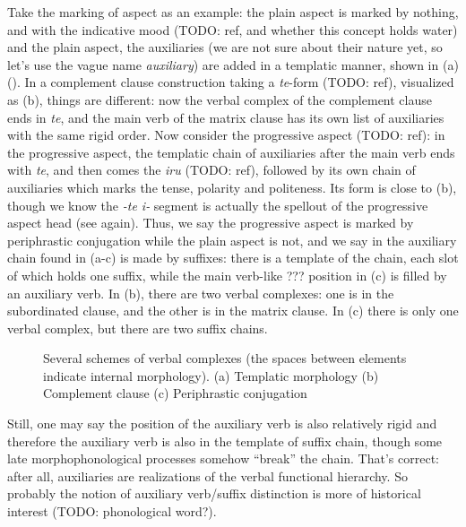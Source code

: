 \documentclass[UTF8, a4paper, oneside, scheme=plain]{ctexrep}
\newcommand*{\term}[1]{\emph{#1}}
\newcommand{\corpus}[1]{\emph{#1}}
\begin{document}
Take the marking of aspect as an example:
the plain aspect is marked by nothing, and with the indicative mood (TODO: ref, and whether this concept holds water) and the plain aspect,
the auxiliaries (we are not sure about their nature yet, so let's use the vague name \term{auxiliary}) 
are added in a templatic manner, shown in (a) 
().
In a complement clause construction taking a \corpus{te}-form (TODO: ref),
visualized as (b),
things are different: now the verbal complex of the complement clause ends in \corpus{te},
and the main verb of the matrix clause has its own list of auxiliaries with the same rigid order.
Now consider the progressive aspect (TODO: ref):
in the progressive aspect, the templatic chain of auxiliaries after the main verb ends with \corpus{te},
and then comes the \corpus{iru} (TODO: ref), followed by its own chain of auxiliaries 
which marks the tense, polarity and politeness.
Its form is close to (b),
though we know the \corpus{-te i-} segment is actually the spellout of the progressive aspect head 
(see  again).
Thus, we say the progressive aspect is marked by periphrastic conjugation 
while the plain aspect is not,
and we say in the auxiliary chain found in 
(a-c)
is made by suffixes: 
there is a template of the chain, each slot of which holds one suffix,
while the main verb-like ??? position in (c) 
is filled by an auxiliary verb.
In (b),
there are two verbal complexes:
one is in the subordinated clause,
and the other is in the matrix clause.
In (c)
there is only one verbal complex,
but there are two suffix chains.

\begin{figure}[H]
    \centering
    
    \caption{Several schemes of verbal complexes (the spaces between elements indicate internal morphology). 
    (a) Templatic morphology (b) Complement clause (c) Periphrastic conjugation}
    \label{fig:verb-complex-scheme}
\end{figure}

Still, one may say the position of the auxiliary verb is also relatively rigid 
and therefore the auxiliary verb is also in the template of suffix chain,
though some late morphophonological processes somehow ``break'' the chain.
That's correct: after all, auxiliaries are realizations of the verbal functional hierarchy.
So probably the notion of auxiliary verb/suffix distinction is more of historical interest
(TODO: phonological word?).
\end{document}
